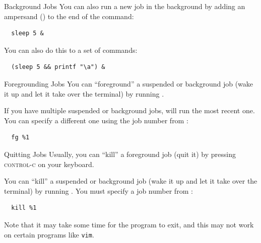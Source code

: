 \begin{frame}[fragile]{Background Jobs}
  You can also run a new job in the background by adding an ampersand (\cmd{&})
  to the end of the command:

  \begin{verbatim}
  sleep 5 &
  \end{verbatim}
  \pause

  You can also do this to a set of commands:

  \begin{verbatim}
  (sleep 5 && printf "\a") &
  \end{verbatim}
\end{frame}

\begin{frame}[fragile]{Foregrounding Jobs}
  You can \enquote{foreground} a suspended or background job (wake it up and
  let it take over the terminal) by running .

  \pause

  If you have multiple suspended or background jobs,  will run the most
  recent one. You can specify a different one using the job number from
  :

  \begin{verbatim}
  fg %1
  \end{verbatim}
\end{frame}

\begin{frame}[fragile]{Quitting Jobs}
  Usually, you can \enquote{kill} a foreground job (quit it) by pressing
  \textsc{control-c} on your keyboard.

  \pause

  You can \enquote{kill} a suspended or background job (wake it up and let it
  take over the terminal) by running . You must specify a job number
  from :

  \begin{verbatim}
  kill %1
  \end{verbatim}

  \pause

  Note that it may take some time for the program to exit, and this may not
  work on certain programs like \texttt{vim}.
\end{frame}

